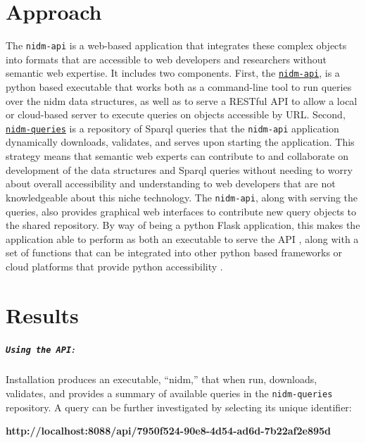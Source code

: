 \documentclass[twocolumn]{bmcart}%
\begin{document}
\section{Approach}\label{approach}
The \texttt{nidm-api} \cite{noauthor_undated-hq} is a web-based application that integrates these complex objects into formats that are accessible to web developers and researchers without semantic web expertise. It includes two components. First, the \href{https://github.com/incf-nidash/nidm-api}{\texttt{nidm-api}}, is a python based executable that works both as a command-line tool to run queries over the nidm data structures, as well as to serve a RESTful API to allow a local or cloud-based server to execute queries on objects accessible by URL. Second, \href{https://github.com/incf-nidash/nidm-queries}{\texttt{nidm-queries}} is a repository of Sparql queries that the \texttt{nidm-api} application dynamically downloads, validates, and serves upon starting the application. This strategy means that semantic web experts can contribute to and collaborate on development of the data structures and Sparql queries without needing to worry about overall accessibility and understanding to web developers that are not knowledgeable about this niche technology. The \texttt{nidm-api}, along with serving the queries, also provides graphical web interfaces to contribute new query objects to the shared repository. By way of being a python Flask \cite{noauthor_undated-ia} application, this makes the application able to perform as both an executable to serve the API \cite{noauthor_undated-ii}, along with a set of functions that can be integrated into other python based frameworks \cite{noauthor_undated-ej} or cloud platforms that provide python accessibility \cite{noauthor_undated-jw}\cite{Google_undated-aj}. 

\section{Results}\label{results}
\subparagraph{\texorpdfstring{\texttt{Using the API}:}{:}}\label{section}
Installation produces an executable, “nidm,” that when run, downloads, validates, and provides a summary of available queries in the \texttt{nidm-queries} repository. A query can be further investigated by selecting its unique identifier: \newline

\textbf{http://localhost:8088/api/7950f524-90e8-4d54-ad6d-7b22af2e895d}\newline
\end{document}
